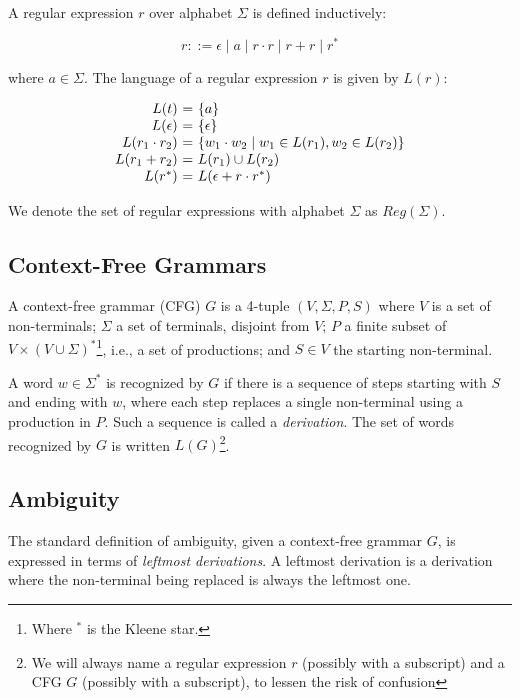 \documentclass[acmsmall,review,anonymous]{acmart}\settopmatter{printfolios=true,printccs=false,printacmref=false}
\newcommand{\NT}{V} %
\newcommand{\T}{\Sigma} %
\newcommand{\regex}{\mathit{Reg}}
\begin{document}
A regular expression $r$ over alphabet $\T$ is defined inductively:

$$r ::= \epsilon \mid a \mid r \cdot r \mid r + r \mid r^{*}$$

\noindent where $a \in \T$. The language of a regular expression $r$ is given by $L(r)$:

$$
\begin{array}{r@{\ =\ }l}
  L(t) & \{a\} \\
  L(\epsilon) & \{\epsilon\} \\
  L(r_1 \cdot r_2) & \{ w_1 \cdot w_2 \mid w_1 \in L(r_1), w_2 \in L(r_2) \} \\
  L(r_1 + r_2) & L(r_1) \cup L(r_2) \\
  L(r^{*}) & L(\epsilon + r \cdot r^{*}) \\
\end{array}
$$

\noindent We denote the set of regular expressions with alphabet $\T$ as $\regex(\T)$.

\subsection{Context-Free Grammars} \label{sec:preliminaries-cfgs}

A context-free grammar (CFG) $G$ is a 4-tuple $(\NT, \T, P, S)$ where $\NT$ is a set of non-terminals; $\T$ a set of terminals, disjoint from $\NT$; $P$ a finite subset of $\NT \times (\NT \cup \T)^{*}$\footnote{Where $^{*}$ is the Kleene star.}, i.e., a set of productions; and $S \in \NT$ the starting non-terminal.

 A word $w \in \T^{*}$ is recognized by $G$ if there is a sequence of steps starting with $S$ and ending with $w$, where each step replaces a single non-terminal using a production in $P$. Such a sequence is called a \emph{derivation}. The set of words recognized by $G$ is written $L(G)$\footnote{We will always name a regular expression $r$ (possibly with a subscript) and a CFG $G$ (possibly with a subscript), to lessen the risk of confusion}.

\subsection{Ambiguity} \label{sec:preliminaries-ambiguity}

The standard definition of ambiguity, given a context-free grammar $G$, is expressed in terms of \emph{leftmost derivations}. A leftmost derivation is a derivation where the non-terminal being replaced is always the leftmost one.
\end{document}
